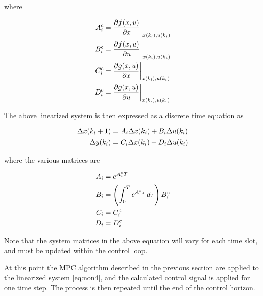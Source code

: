             where
            
            \begin{equation}
                \label{eq:non3}
                \aligned
                    A_i^c &= \biggl.\frac{\partial f(x,u)}{\partial x}\biggr|_{x(k_i),u(k_i)}\\
                    B_i^c &= \biggl.\frac{\partial f(x,u)}{\partial u}\biggr|_{x(k_i),u(k_i)}\\
                    C_i^c &= \biggl.\frac{\partial g(x,u)}{\partial x}\biggr|_{x(k_i), u(k_i)}\\
                    D_i^c &= \biggl.\frac{\partial g(x,u)}{\partial u}\biggr|_{x(k_i), u(k_i)}
                \endaligned
            \end{equation}
            
            The above linearized system is then expressed as a discrete time equation as
            
            \begin{equation}
                \label{eq:non4}
                \aligned
                    \Delta x(k_i+1) & = A_i \Delta  x(k_i) + B_i \Delta  u(k_i)\\
                    \Delta y(k_i)   & = C_i \Delta x(k_i) + D_i \Delta u(k_i)
                \endaligned
            \end{equation}
            
            where the various matrices are
            
            \begin{equation}
                \label{eq:non5}
                \aligned
                    A_i &= e^{A_i^c T} \\
                    B_i & = \left (  \int_{0}^{T} e^{A_i^c \tau}\, d\tau \right ) B_i^c \\
                    C_i & = C_i^c \\
                    D_i &= D_i^c
                \endaligned
            \end{equation}
            
            Note that the system matrices in the above equation will vary for each time slot, and must be updated within the control loop.
            
            At this point the MPC algorithm described in the previous section are applied to the linearized system \eqref{eq:non4}, and the calculated control signal is applied for one time step. The process is then repeated until the end of the control horizon.
            
